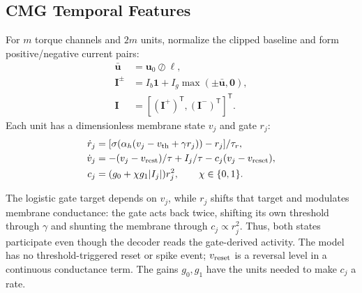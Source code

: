 \documentclass[letterpaper, 10 pt, conference]{ieeeconf}
\newcommand{\T}{^{\mathsf T}}
\begin{document}
\subsection{CMG Temporal Features}

For $m$ torque channels and $2m$ units, normalize the clipped baseline and
form positive/negative current pairs:
\begin{equation}
 \begin{aligned}
 \bar{\bm u}&=\bm u_0\oslash\bm\ell,\\
 \bm I^{\pm}&=I_b\bm1+I_g\max(\pm\bar{\bm u},\bm0),\\
 \bm I&=[(\bm I^+)\T,(\bm I^-)\T]\T.
 \end{aligned}
 \label{eq:encoding}
\end{equation}
Each unit has a dimensionless membrane state $v_j$ and gate $r_j$:
\begin{align}
 \dot r_j&=[\sigma(\alpha_h(v_j-v_{\rm th}+\gamma r_j))-r_j]/\tau_r,\\
 \dot v_j&=-(v_j-v_{\rm rest})/\tau+I_j/\tau-c_j(v_j-v_{\rm reset}),\\
 c_j&=(g_0+\chi g_1|I_j|)r_j^2,\qquad \chi\in\{0,1\}.
 \label{eq:cmg}
\end{align}

%
The logistic gate target depends on $v_j$, while $r_j$ shifts that target
and modulates membrane conductance: the gate acts back twice, shifting its own threshold through $\gamma$ and shunting the membrane through $c_j\propto r_j^2$. Thus, both states participate even
though the decoder reads the gate-derived activity. The model has no
threshold-triggered reset or spike event; $v_{\rm reset}$ is a reversal
level in a continuous conductance term. The gains $g_0,g_1$ have the units
needed to make $c_j$ a rate.
\end{document}
